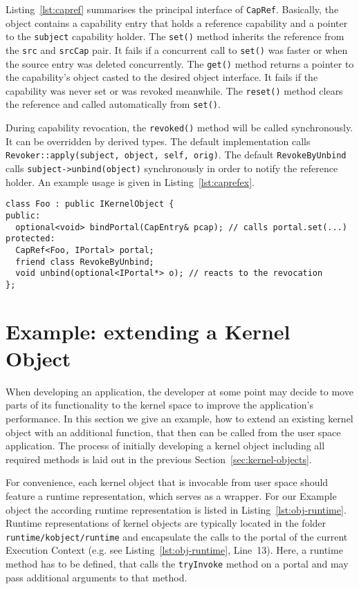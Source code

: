 Listing~\ref{lst:capref} summarises the principal interface of
\texttt{CapRef}. Basically, the object contains a capability entry
that holds a reference capability and a pointer to the
\texttt{subject} capability holder.  The \texttt{set()} method
inherits the reference from the \texttt{src} and \texttt{srcCap} pair.
It fails if a concurrent call to \texttt{set()} was faster or when the
source entry was deleted concurrently.  The \texttt{get()} method
returns a pointer to the capability's object casted to the desired
object interface.  It fails if the capability was never set or was
revoked meanwhile.  The \texttt{reset()} method clears the reference
and called automatically from \texttt{set()}.

During capability revocation, the \texttt{revoked()} method will be
called synchronously.  It can be overridden by derived types.  The
default implementation calls 
\lstinline{Revoker::apply(subject, object, self, orig)}.
The default \texttt{RevokeByUnbind} calls
\lstinline{subject->unbind(object)} synchronously in order to notify the reference
holder. An example usage is given in Listing~\ref{lst:caprefex}.

\begin{lstlisting}[float, label=lst:caprefex, caption=An example use of weak references.]
class Foo : public IKernelObject {
public:
  optional<void> bindPortal(CapEntry& pcap); // calls portal.set(...)
protected:
  CapRef<Foo, IPortal> portal;
  friend class RevokeByUnbind;
  void unbind(optional<IPortal*> o); // reacts to the revocation
};
\end{lstlisting}

\section{Example: extending a Kernel Object}
\label{sec:objects-example}

When developing an application, the developer at some point may decide to move
parts of its functionality to the kernel space to improve the application's
performance. In this section we give an example, how to extend an existing
kernel object with an additional function, that then can be called from the user space
application. The process of initially developing a kernel object including all
required methods is laid out in the previous Section~\ref{sec:kernel-objects}.

For convenience, each kernel object that is invocable from user space should
feature a runtime representation, which serves as a wrapper.  For our Example
object the according runtime representation is listed in
Listing~\ref{lst:obj-runtime}. Runtime representations of kernel objects are
typically located in the folder \texttt{runtime/kobject/runtime} and
encapsulate the calls to the portal of the current Execution Context (e.g. see
Listing~\ref{lst:obj-runtime}, Line~13). Here, a runtime method has to be
defined, that calls the \texttt{tryInvoke} method on a portal and may pass
additional arguments to that method.

